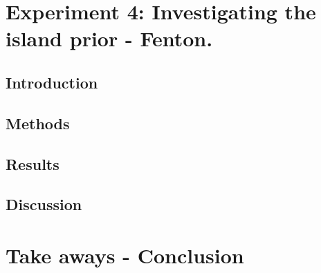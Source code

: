 \section{Experiment 4: Investigating the island prior - Fenton.}
\subsection{Introduction}

\subsection{Methods}

\subsection{Results}

\subsection{Discussion}

\section{Take aways - Conclusion}


